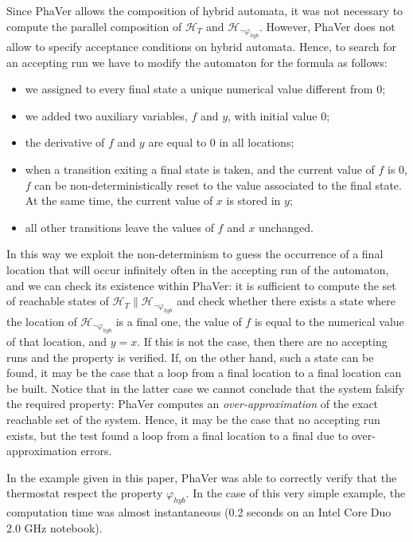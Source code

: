\documentclass[submission,copyright,creativecommons]{eptcs}
\newcommand{\autH}{\mathcal{H}}
\begin{document}
Since PhaVer allows the composition of hybrid automata, it was not necessary to compute the parallel composition of $\autH_T$ and $\autH_{\neg\varphi_{hyb}}$. However, PhaVer does not allow to specify acceptance conditions on hybrid automata. Hence, to search for an accepting run we have to modify the automaton for the formula as follows:
\begin{itemize}
	\item we assigned to every final state a unique numerical value different from $0$;
	\item we added two auxiliary variables, $f$ and $y$, with initial value $0$;
	\item the derivative of $f$ and $y$ are equal to $0$ in all locations;
	\item when a transition exiting a final state is taken, and the current value of $f$ is $0$,
		$f$ can be non-deterministically reset to the value associated to the final state. At the same time, the current value of $x$ is stored in $y$;
	\item all other transitions leave the values of $f$ and $x$ unchanged.
\end{itemize}

\noindent In this way we exploit the non-determinism to guess the occurrence of a final location that will occur infinitely often in the accepting run of the automaton, and we can check its existence within PhaVer: it is sufficient to compute the set of reachable states of $\autH_T \| \autH_{\neg\varphi_{hyb}}$ and check whether there exists a state where the location of $\autH_{\neg\varphi_{hyb}}$ is a final one, the value of $f$ is equal to the numerical value of that location, and $y = x$. If this is not the case, then there are no accepting runs and 
the property is verified. If, on the other hand, such a state can be found, it may be the case that a loop from a final location to a final location can be built. Notice that in the latter case we cannot conclude that the system falsify the required property: PhaVer computes an \emph{over-approximation} of the exact reachable set of the system. Hence, it may be the case that no accepting run exists, but the test found a loop from a final location to a final due to over-approximation errors.

In the example given in this paper, PhaVer was able to correctly verify that the thermostat respect the property $\varphi_{hyb}$. In the case of this very simple example, the computation time was almost instantaneous (0.2 seconds on an Intel Core Duo 2.0 GHz notebook).
\end{document}
